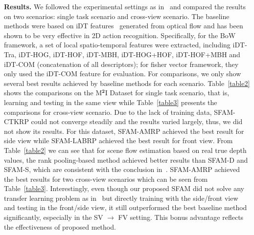 \documentclass[10pt,twocolumn,letterpaper]{article}
\begin{document}
\textbf{Results.} We followed the experimental settings as 
in~\cite{liu2016benchmarking} 
and compared the results on two scenarios: single task scenario and cross-view 
scenario. 
 The baseline methods were based on iDT features~\cite{wang2013action}  
generated from optical flow and has been shown to be very effective in 2D 
action recognition. Specifically, for the BoW framework, a set of local 
spatio-temporal features were extracted, including iDT-Tra, iDT-HOG, iDT-HOF, 
iDT-MBH, iDT-HOG+HOF, iDT-HOF+MBH and iDT-COM (concatenation of all 
descriptors); for fisher vector framework, they only used the iDT-COM feature 
for evaluation. For comparisons, we only show several best results achieved by 
baseline methods for each scenario. Table~\ref{table2} shows the comparisons on 
the M$^{\textbf{2}}$I Dataset for single task scenario, that is, learning and 
testing in the same view while Table~\ref{table3} presents the comparisons for 
cross-view scenario. Due to the lack of training data, SFAM-CTKRP could not 
converge steadily and the results varied largely, thus, we did not show its 
results. For this dataset, SFAM-AMRP achieved the best result for side view 
while SFAM-LABRP achieved the best result for front view. From 
Table~\ref{table2} we can see that for scene flow estimation based on real true 
depth values, the rank pooling-based method achieved better results than SFAM-D 
and SFAM-S, which are consistent with the conclusion 
in~\cite{liu2016benchmarking}. SFAM-AMRP achieved the best results for two 
cross-view scenarios which can be seen from Table~\ref{table3}.  Interestingly, 
even though our proposed SFAM  did not solve any transfer learning problem as 
in~\cite{liu2016benchmarking} but directly training with the side/front view 
and testing in the front/side view, it still outperformed the best baseline 
method significantly, especially in the SV $\rightarrow$ FV setting. This bonus 
advantage reflects the effectiveness of proposed method. 
\end{document}
